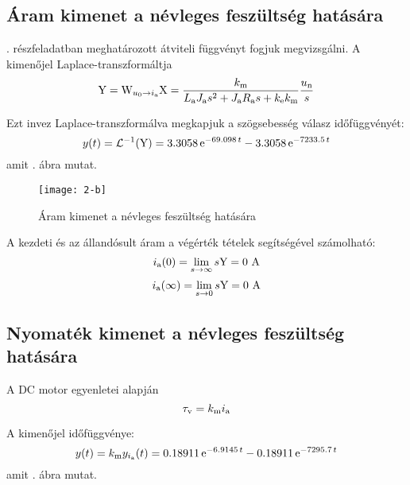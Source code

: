 
\subsection{Áram kimenet a névleges feszültség hatására}

. részfeladatban meghatározott átviteli függvényt fogjuk megvizsgálni.
%
A kimenőjel Laplace-transzformáltja
\begin{equation}
	\mathrm{Y} = \mathrm{W}_{u_0\rightarrow i_\text{a}}\mathrm{X} = \frac{k_\text{m} }{L_\text{a}J_\text{a} s^2 + J_\text{a}R_\text{a} s + k_\text{e}k_\text{m}}\frac{u_\text{n}}{s}
\end{equation}

Ezt invez Laplace-transzformálva megkapjuk a szögsebesség válasz időfüggvényét:
\begin{equation}
	y(t) = \mathcal{L}^{-1}(\mathrm{Y}) = 
	3.3058\, \mathrm{e}^{- 69.098\, t} - 3.3058\, \mathrm{e}^{- 7233.5\, t}
\end{equation}
amit . ábra mutat.

\begin{figure}[H]
	\centering
	\texttt{[image: 2-b]}
	\caption{Áram kimenet a névleges feszültség hatására}
	\label{fig:2-b}
\end{figure}

A kezdeti és az állandósult áram a végérték tételek segítségével számolható:
\begin{equation}
	i_\text{a}(0) = \lim\limits_{s\rightarrow \infty}s\mathrm{Y} = 0\text{ A}
\end{equation}
\begin{equation}
	i_\text{a}(\infty) = \lim\limits_{s\rightarrow 0}s\mathrm{Y} = 0\text{ A}
\end{equation}


\subsection{Nyomaték kimenet a névleges feszültség hatására}

A DC motor egyenletei alapján
\begin{equation}
	\tau_\text{v} = k_\text{m} i_\text{a}
\end{equation}

A kimenőjel időfüggvénye:
\begin{equation}
	y(t) = k_\text{m} y_{i_\text{a}}(t) =
	0.18911\, \mathrm{e}^{- 6.9145\, t} - 0.18911\, \mathrm{e}^{- 7295.7\, t}
\end{equation}
amit . ábra mutat.

